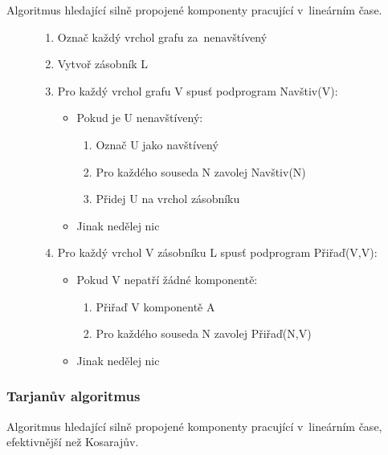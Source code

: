Algoritmus hledající silně propojené komponenty pracující v~lineárním čase.

\begin{figure}[ht]
\onehalfspacing
\begin{enumerate}
\item Označ každý vrchol grafu za~nenavštívený
\item Vytvoř zásobník L
\item Pro každý vrchol grafu V spusť podprogram Navštiv(V):
    \begin{itemize}
    \item Pokud je U nenavštívený:
        \begin{enumerate}
        \item Označ U jako navštívený
        \item Pro každého souseda N zavolej Navštiv(N)
        \item Přidej U na vrchol zásobníku
        \end{enumerate}
    \item Jinak nedělej nic
    \end{itemize}
\item Pro každý vrchol V zásobníku L spusť podprogram Přiřaď(V,V):
    \begin{itemize}
    \item Pokud V nepatří žádné komponentě:
        \begin{enumerate}
        \item Přiřaď V komponentě A
        \item Pro každého souseda N zavolej Přiřaď(N,V)
        \end{enumerate}
    \item Jinak nedělej nic
    \end{itemize}
\end{enumerate}
\end{figure}
\FloatBarrier

\subsubsection{Tarjanův algoritmus}

Algoritmus hledající silně propojené komponenty pracující v~lineárním čase, efektivnější než Kosarajův.

